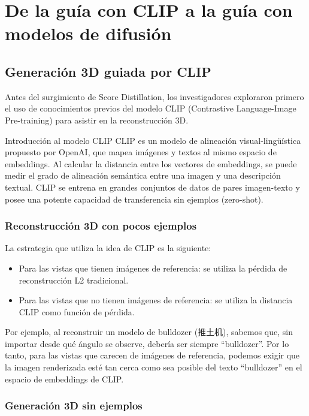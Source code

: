 \section{De la guía con CLIP a la guía con modelos de difusión}

\subsection{Generación 3D guiada por CLIP}

Antes del surgimiento de Score Distillation, los investigadores exploraron primero el uso de conocimientos previos del modelo CLIP (Contrastive Language-Image Pre-training) para asistir en la reconstrucción 3D.

\begin{knowledgebox}{Introducción al modelo CLIP}
CLIP es un modelo de alineación visual-lingüística propuesto por OpenAI, que mapea imágenes y textos al mismo espacio de embeddings. Al calcular la distancia entre los vectores de embeddings, se puede medir el grado de alineación semántica entre una imagen y una descripción textual. CLIP se entrena en grandes conjuntos de datos de pares imagen-texto y posee una potente capacidad de transferencia sin ejemplos (zero-shot).
\end{knowledgebox}

\subsubsection{Reconstrucción 3D con pocos ejemplos}

La estrategia que utiliza la idea de CLIP es la siguiente:
\begin{itemize}
    \item Para las vistas que tienen imágenes de referencia: se utiliza la pérdida de reconstrucción L2 tradicional.
    \item Para las vistas que no tienen imágenes de referencia: se utiliza la distancia CLIP como función de pérdida.
\end{itemize}

Por ejemplo, al reconstruir un modelo de bulldozer (推土机), sabemos que, sin importar desde qué ángulo se observe, debería ser siempre ``bulldozer''. Por lo tanto, para las vistas que carecen de imágenes de referencia, podemos exigir que la imagen renderizada esté tan cerca como sea posible del texto ``bulldozer'' en el espacio de embeddings de CLIP.

\subsubsection{Generación 3D sin ejemplos}

